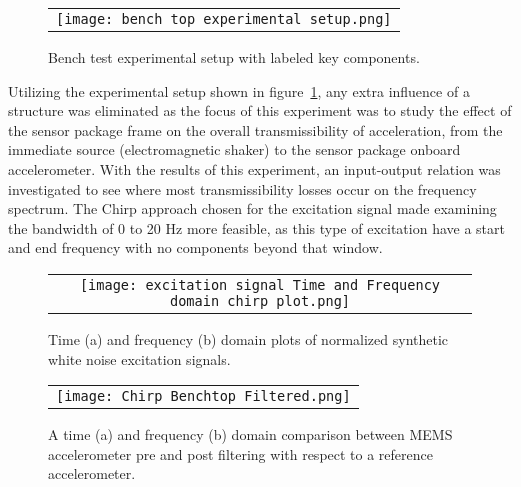 \documentclass[]{spie}  %
\begin{document}
	\begin{figure} [h]
		\begin{center}
			\begin{tabular}{c} 
				\texttt{[image: bench top experimental  setup.png]}
			\end{tabular}
		\end{center}
		\caption[example] 
		{ \label{fig:bench top experimental setup} 
			Bench test experimental setup with labeled key components.}
	\end{figure} 
	
	Utilizing the experimental setup shown in figure~\ref{fig:bench top experimental setup}, any extra influence of a structure was eliminated as the focus of this experiment was to study the effect of the sensor package frame on the overall transmissibility of acceleration, from the immediate source (electromagnetic shaker) to the sensor package onboard accelerometer. With the results of this experiment, an input-output relation was investigated to see where most transmissibility losses occur on the frequency spectrum. The Chirp approach chosen for the excitation signal made examining the bandwidth of 0 to 20 Hz more feasible, as this type of excitation have a start and end frequency with no components beyond that window.
	
	\begin{figure} [H]
		\begin{center}
			\begin{tabular}{c} 
				\texttt{[image: excitation signal Time and Frequency domain chirp plot.png]}
			\end{tabular}
		\end{center}
		\caption[example] 
		{ \label{fig:excitation signal Time and Frequency domain chirp plot} 
			Time (a) and frequency (b) domain plots of normalized synthetic white noise excitation signals.}
	\end{figure}

	\begin{figure} [H]
		\begin{center}
			\begin{tabular}{c} 
				\texttt{[image: Chirp Benchtop Filtered.png]}
			\end{tabular}
		\end{center}
		\caption[example] 
		{ \label{fig:excitation signal plot} 
			A time (a) and frequency (b) domain comparison between MEMS accelerometer pre and post filtering with respect to a reference accelerometer.}
	\end{figure}
	
\end{document}
